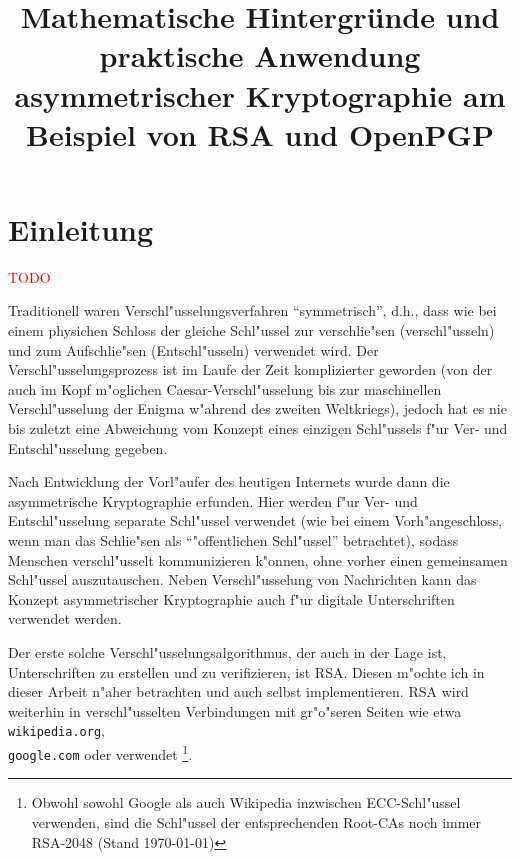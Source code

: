 \documentclass[12pt]{article}
\title{Mathematische Hintergr\"unde und praktische Anwendung asymmetrischer Kryptographie am Beispiel von RSA und OpenPGP}
\newcommand{\todo}[1]{\textcolor{red}{\mbox{TODO}}\marginpar{\textcolor{red}{#1}}}
\begin{document}
\maketitle
\thispagestyle{empty}
\newpage
\tableofcontents
\newpage

\section{Einleitung}

\todo{Brauche ich f"ur diese Sachen Zitate?}

Traditionell waren Verschl"usselungsverfahren "`symmetrisch"', d.h., dass wie bei einem physichen Schloss
der gleiche Schl"ussel zur verschlie"sen (verschl"usseln) und zum Aufschlie"sen (Entschl"usseln) verwendet wird.
Der Ver\-schl"us\-sel\-ungs\-pro\-zess ist im Laufe der Zeit komplizierter geworden
(von der auch im Kopf m"oglichen Caesar-Verschl"usselung bis zur
maschinellen Verschl"usselung der Enigma w"ah\-rend des zweiten Weltkriegs),
jedoch hat es nie bis zuletzt
eine Abweichung vom Konzept eines einzigen Schl"ussels f"ur Ver- und Entschl"usselung gegeben.

Nach Entwicklung der Vorl"aufer des heutigen Internets wurde dann die asymmetrische Kryptographie erfunden.
Hier werden f"ur Ver- und Entschl"usselung separate Schl"ussel verwendet
(wie bei einem Vorh"angeschloss, wenn man das Schlie"sen als "`"offentlichen Schl"ussel"' betrachtet),
sodass Menschen verschl"usselt kom\-mu\-ni\-zie\-ren k"onnen, ohne vorher einen gemeinsamen Schl"ussel auszutauschen.
Neben Verschl"usselung von Nachrichten kann das Konzept asymmetrischer Kryptographie
auch f"ur digitale Unterschriften verwendet werden.

Der erste solche Verschl"usselungsalgorithmus, der auch in der Lage ist, Unterschriften zu erstellen und zu verifizieren, ist RSA.
Diesen m"ochte ich in dieser Arbeit n"aher betrachten und auch selbst implementieren.
RSA wird weiterhin in verschl"usselten Verbindungen mit gr"o"seren Seiten
wie etwa \texttt{wikipedia.org}, \\ \texttt{google.com} oder \piibigsite{} verwendet%
\footnote{Obwohl sowohl Google als auch Wikipedia inzwischen ECC-Schl"ussel verwenden,
sind die Schl"ussel der entsprechenden Root-CAs noch immer RSA-2048 (Stand \today)}.
\end{document}
